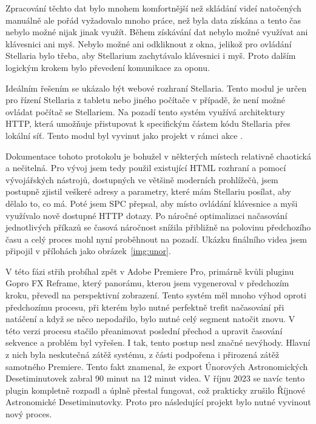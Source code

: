 \documentclass[12pt,a4paper,titlepage]{article}
\begin{document}
Zpracování těchto dat bylo mnohem komfortnější než skládání videí natočených manuálně ale pořád vyžadovalo mnoho práce, než byla data získána a tento čas nebylo možné nijak jinak využít. Během získávání dat nebylo možné využívat ani klávesnici ani myš. Nebylo možné ani odkliknout z okna, jelikož pro ovládání Stellaria bylo třeba, aby Stellarium zachytávalo klávesnici i myš. Proto dalším logickým krokem bylo převedení komunikace za oponu. 

Ideálním řešením se ukázalo být webové rozhraní Stellaria. Tento modul je určen pro řízení Stellaria z tabletu nebo jiného počítače v případě, že není možné ovládat počítač se Stellariem. Na pozadí tento systém využívá architektury HTTP, která umožňuje přistupovat k specifickým částem kódu Stellaria přes lokální síť. Tento modul byl vyvinut jako projekt v rámci akce . 

Dokumentace tohoto protokolu je bohužel v některých místech relativně chaotická a nečitelná. Pro vývoj jsem tedy použil existující HTML rozhraní a pomocí vývojářských nástrojů, dostupných ve většině moderních prohlížečů, jsem postupně zjistil veškeré adresy a parametry, které mám Stellariu posílat, aby dělalo to, co má. Poté jsem SPC přepsal, aby místo ovládání klávesnice a myši využívalo nově dostupné HTTP dotazy. Po náročné optimalizaci načasování jednotlivých příkazů se časová náročnost snížila přibližně na polovinu předchozího času a celý proces mohl nyní proběhnout na pozadí. Ukázku finálního videa jsem připojil v přílohách jako obrázek~\ref{img:unor}.

V této fázi střih probíhal zpět v Adobe Premiere Pro, primárně kvůli pluginu Gopro FX Reframe, který panorámu, kterou jsem vygeneroval v předchozím kroku, převedl na perspektivní zobrazení. Tento systém měl mnoho výhod oproti předchozímu procesu, při kterém bylo nutné perfektně trefit načasování při natáčení a když se něco nepodařilo, bylo nutné celý segment natočit znovu. V této verzi procesu stačilo přeanimovat poslední přechod a upravit časování sekvence a problém byl vyřešen. I tak, tento postup nesl značné nevýhody. Hlavní z nich byla neskutečná zátěž systému, z části podpořena i přirozená zátěž samotného Premiere. Tento fakt znamenal, že export Únorových Astronomických Desetiminutovek zabral 90 minut na 12 minut videa. V říjnu 2023 se navíc tento plugin kompletně rozpadl a úplně přestal fungovat, což prakticky zrušilo Říjnové Astronomické Desetiminutovky. Proto pro následující projekt bylo nutné vyvinout nový proces. 
\end{document}
